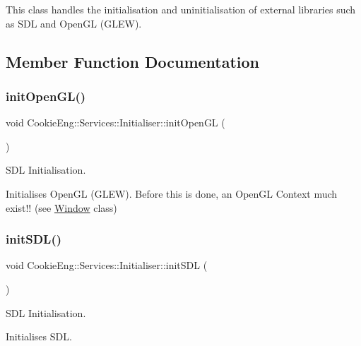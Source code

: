 This class handles the initialisation and uninitialisation of external libraries such as S\+DL and Open\+GL (G\+L\+EW). 

\subsection{Member Function Documentation}
\mbox{\label{class_cookie_eng_1_1_services_1_1_initialiser_ae58fde55a85e7d2dfe3c1396aa64cad2}} 
\subsubsection{\texorpdfstring{init\+Open\+G\+L()}{initOpenGL()}}
{\footnotesize\ttfamily void Cookie\+Eng\+::\+Services\+::\+Initialiser\+::init\+Open\+GL (\begin{DoxyParamCaption}{ }\end{DoxyParamCaption})}



S\+DL Initialisation. 

Initialises Open\+GL (G\+L\+EW). Before this is done, an Open\+GL Context much exist!! (see \hyperlink{class_cookie_eng_1_1_window}{Window} class) \mbox{\label{class_cookie_eng_1_1_services_1_1_initialiser_afec78a371e6345982eda8b928065e5fa}} 
\subsubsection{\texorpdfstring{init\+S\+D\+L()}{initSDL()}}
{\footnotesize\ttfamily void Cookie\+Eng\+::\+Services\+::\+Initialiser\+::init\+S\+DL (\begin{DoxyParamCaption}{ }\end{DoxyParamCaption})}



S\+DL Initialisation. 

Initialises S\+DL. 

